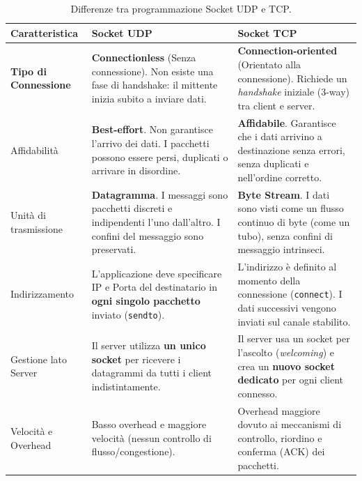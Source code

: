 \documentclass[a4paper,12pt]{report}
\renewcommand{\arraystretch}{1.2} %
\begin{document}
\begin{table}[H]
    \centering
    \renewcommand{\arraystretch}{1.6} %
    \begin{tabularx}{\textwidth}{@{} >{\bfseries}l X X @{}}
        \toprule
        \textbf{Caratteristica} & \textbf{Socket UDP} & \textbf{Socket TCP} \\
        \midrule
        
        Tipo di Connessione & 
        \textbf{Connectionless} (Senza connessione). Non esiste una fase di handshake: il mittente inizia subito a inviare dati. & 
        \textbf{Connection-oriented} (Orientato alla connessione). Richiede un \textit{handshake} iniziale (3-way) tra client e server. \\
        \addlinespace
        
        Affidabilità & 
        \textbf{Best-effort}. Non garantisce l'arrivo dei dati. I pacchetti possono essere persi, duplicati o arrivare in disordine. & 
        \textbf{Affidabile}. Garantisce che i dati arrivino a destinazione senza errori, senza duplicati e nell'ordine corretto. \\
        \addlinespace
        
        Unità di trasmissione & 
        \textbf{Datagramma}. I messaggi sono pacchetti discreti e indipendenti l'uno dall'altro. I confini del messaggio sono preservati. & 
        \textbf{Byte Stream}. I dati sono visti come un flusso continuo di byte (come un tubo), senza confini di messaggio intrinseci. \\
        \addlinespace
        
        Indirizzamento & 
        L'applicazione deve specificare IP e Porta del destinatario in \textbf{ogni singolo pacchetto} inviato (\texttt{sendto}). & 
        L'indirizzo è definito al momento della connessione (\texttt{connect}). I dati successivi vengono inviati sul canale stabilito. \\
        \addlinespace
        
        Gestione lato Server & 
        Il server utilizza \textbf{un unico socket} per ricevere i datagrammi da tutti i client indistintamente. & 
        Il server usa un socket per l'ascolto (\textit{welcoming}) e crea un \textbf{nuovo socket dedicato} per ogni client connesso. \\
        \addlinespace
        
        Velocità e Overhead & 
        Basso overhead e maggiore velocità (nessun controllo di flusso/congestione). & 
        Overhead maggiore dovuto ai meccanismi di controllo, riordino e conferma (ACK) dei pacchetti. \\
        
        \bottomrule
    \end{tabularx}
    \caption{Differenze tra programmazione Socket UDP e TCP.}
    \label{tab:confronto_socket}
\end{table}
\end{document}

